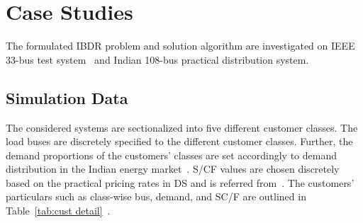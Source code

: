 \documentclass[journal]{IEEEtran}
\begin{document}
\section{Case Studies}
 The formulated IBDR problem and solution algorithm are investigated on IEEE 33-bus test system~\cite{baran1989network} and Indian 108-bus practical distribution system\mbox{\cite{meena2018optimal}}. 

 \vspace{-2mm}
\subsection{Simulation Data}
The considered systems are sectionalized into five different customer classes. The load buses are discretely specified to the different customer classes. Further, the demand proportions of the customers' classes are set accordingly to demand distribution in the Indian energy market~\cite{share}. S/CF values are chosen discretely based on the practical pricing rates in DS and is referred from~\cite{PANDEY2022107597}. The customers' particulars such as class-wise bus, demand, and SC/F are outlined in Table~\mbox{\ref{tab:cust detail}}~\cite{PANDEY2022107597}. 
\end{document}
